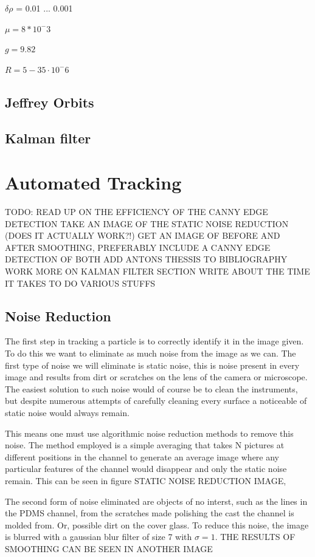 \documentclass[]{report}
\begin{document}
$\delta \rho$ = 0.01 ... 0.001

$\mu = 8*10^-3$

$g = 9.82$

$R = 5 - 35 \cdot 10^-6$


\section{Jeffrey Orbits}

\section{Kalman filter}
\chapter{Automated Tracking}
TODO:
READ UP ON THE EFFICIENCY OF THE CANNY EDGE DETECTION
TAKE AN IMAGE OF THE STATIC NOISE REDUCTION (DOES IT ACTUALLY WORK?!)
GET AN IMAGE OF BEFORE AND AFTER SMOOTHING, PREFERABLY INCLUDE A CANNY EDGE DETECTION OF BOTH 
ADD ANTONS THESSIS TO BIBLIOGRAPHY
WORK MORE ON KALMAN FILTER SECTION
WRITE ABOUT THE TIME IT TAKES TO DO VARIOUS STUFFS

\section{Noise Reduction}
The first step in tracking a particle is to correctly identify it in the image given. To do this we want to eliminate as much noise from the image as we can. The first type of noise we will eliminate is static noise, this is noise present in every image and results from dirt or scratches on the lens of the camera or microscope. 
The easiest solution to such noise would of course be to clean the instruments, but despite numerous attempts of carefully cleaning every surface a noticeable of static noise would always remain. 

This means one must use algorithmic noise reduction methods to remove this noise. The method employed is a simple averaging that takes N pictures at different positions in the channel to generate an average image where any particular features of the channel would disappear and only the static noise remain. This can be seen in figure STATIC NOISE REDUCTION IMAGE,

The second form of noise eliminated are objects of no interst, such as the lines in the PDMS channel, from the scratches made polishing the cast the channel is molded from. Or, possible dirt on the cover glass. To reduce this noise, the image is blurred with a gaussian blur filter of size 7 with $\sigma=1$. THE RESULTS OF SMOOTHING CAN BE SEEN IN ANOTHER IMAGE
\end{document}
